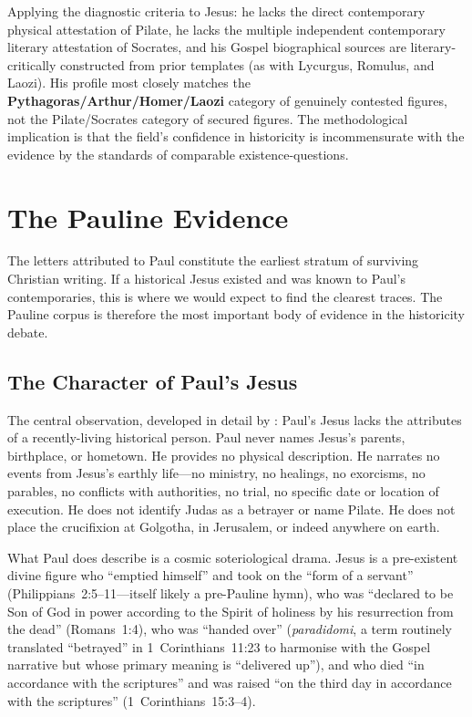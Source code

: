 \documentclass[12pt,oneside]{article}
\newcommand{\grk}[1]{\textit{#1}}
\begin{document}
Applying the diagnostic criteria to Jesus: he lacks the direct
contemporary physical attestation of Pilate, he lacks the multiple
independent contemporary literary attestation of Socrates, and his
Gospel biographical sources are literary-critically constructed
from prior templates (as with Lycurgus, Romulus, and Laozi).  His
profile most closely matches the \textbf{Pythagoras/Arthur/Homer/Laozi}
category of genuinely contested figures, not the Pilate/Socrates
category of secured figures.  The methodological implication is
that the field's confidence in historicity is incommensurate with
the evidence by the standards of comparable existence-questions.

\section{The Pauline Evidence}

The letters attributed to Paul constitute the earliest stratum of
surviving Christian writing.  If a historical Jesus existed and was
known to Paul's contemporaries, this is where we would expect to
find the clearest traces.  The Pauline corpus is therefore the most
important body of evidence in the historicity debate.

\subsection{The Character of Paul's Jesus}

The central observation, developed in detail by
\citet{Doherty1999,Doherty2009}: Paul's Jesus lacks the attributes
of a recently-living historical person.  Paul never names Jesus's
parents, birthplace, or hometown.  He provides no physical
description.  He narrates no events from Jesus's earthly
life---no ministry, no healings, no exorcisms, no parables, no
conflicts with authorities, no trial, no specific date or location
of execution.  He does not identify Judas as a betrayer or name
Pilate.  He does not place the crucifixion at Golgotha, in
Jerusalem, or indeed anywhere on earth.

What Paul does describe is a cosmic soteriological drama.  Jesus is
a pre-existent divine figure who \enquote{emptied himself} and took
on the \enquote{form of a servant} (Philippians~2:5--11---itself
likely a pre-Pauline hymn), who was \enquote{declared to be Son of
God in power according to the Spirit of holiness by his
resurrection from the dead} (Romans~1:4), who was \enquote{handed
over} (\grk{paradidomi}, a term routinely translated
\enquote{betrayed} in 1~Corinthians~11:23 to harmonise with the
Gospel narrative but whose primary meaning is
\enquote{delivered up}), and who died \enquote{in accordance with
the scriptures} and was raised \enquote{on the third day in
accordance with the scriptures} (1~Corinthians~15:3--4).
\end{document}
